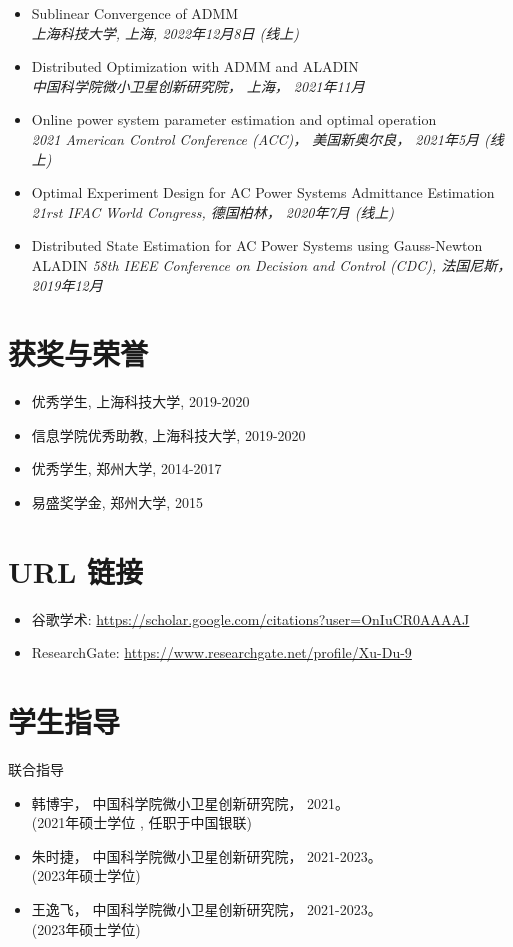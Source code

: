 \documentclass[paper=a4,fontsize=11pt]{scrartcl} %
\newcommand{\sepspace}{\vspace*{1em}}		%
\newcommand{\NewPart}[1]{\section*{\uppercase{#1}}}
\newcommand{\EducationEntry}[4]{
		\noindent \textbf{#1} \hfill      %
		\colorbox{White}{%
			\parbox{5cm}{%
			\hfill\color{Black}#2}} \par  %
		\noindent \textit{#3} \par        %
		\noindent\hangindent=2em\hangafter=0 \small #4 %
		\normalsize \par}
\begin{document}
\begin{CJK*}{UTF8}{gbsn}
\begin{itemize}
	\item {
		{Sublinear Convergence of ADMM}\\
		\emph{上海科技大学, 上海, 2022年12月8日 (线上)	} }
	\item  {
		{Distributed Optimization with ADMM and ALADIN}\\
		\emph{中国科学院微小卫星创新研究院， 上海， 2021年11月
	} }
	
	
	\item  {
		{Online power system parameter estimation and optimal operation}\\
		\emph{2021 American Control Conference (ACC)， 美国新奥尔良， 2021年5月 (线上)
	} }
	
	\item  {
		Optimal Experiment Design for AC Power Systems Admittance Estimation\\
		\emph{21rst IFAC World Congress, 德国柏林， 2020年7月 (线上)
	} }
	
	\item  {
		Distributed State Estimation for AC Power Systems using Gauss-Newton ALADIN 
		\emph{58th IEEE Conference on Decision and Control (CDC),
			法国尼斯， 2019年12月} }
\end{itemize}


\NewPart{获奖与荣誉}
\begin{itemize}
	\item 优秀学生, 上海科技大学, 2019-2020
	
	\item 信息学院优秀助教, 上海科技大学, 2019-2020
		
	
	\item 优秀学生, 郑州大学, 2014-2017
	
	\item 易盛奖学金, 郑州大学, 2015
	
	
	\end{itemize}
%
\NewPart{URL 链接}
\begin{itemize}
	\item 谷歌学术: \url{https://scholar.google.com/citations?user=OnIuCR0AAAAJ}
	\item ResearchGate: \url{https://www.researchgate.net/profile/Xu-Du-9}
\end{itemize}
\NewPart{学生指导}{联合指导}
\begin{itemize}
	\item 韩博宇， 中国科学院微小卫星创新研究院， 2021。\\
	(2021年硕士学位 , 任职于中国银联)
	\item 朱时捷， 中国科学院微小卫星创新研究院， 2021-2023。\\
	(2023年硕士学位)
	\item 王逸飞， 中国科学院微小卫星创新研究院， 2021-2023。\\
	(2023年硕士学位)
\end{itemize}


\end{CJK*}
\end{document}
